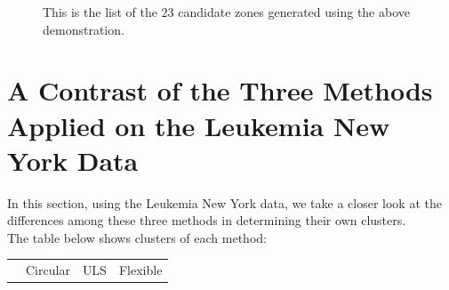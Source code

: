 \documentclass[12pt]{article}
\begin{document}
\begin{enumerate}
\begin{figure}[!ht]
\begin{tabular}{|c|c|c|c|}
		\hline
		\end{tabular}
		
	\caption{This is the list of the 23 candidate zones generated using the above demonstration. \label{f:gull}}	
	\end{figure}

\newpage
	\section{A Contrast of the Three Methods Applied on the Leukemia New York Data}
	In this section, using the Leukemia New York data, we take a closer look at the differences among these three methods in determining their own clusters. \\
	The table below shows clusters of each method:\\
	
	\begin{tabular}{|c|c|c|c|}
	\hline
	& Circular & ULS & Flexible \\
	

\end{tabular}
\end{enumerate}
\end{document}
